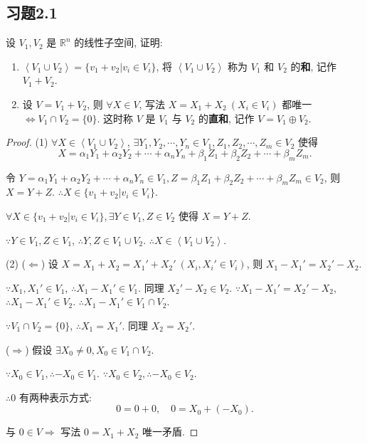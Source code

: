 \documentclass[color=black,device=normal,lang=cn,mode=geye]{elegantnote}
\begin{document}
\subsection{习题2.1}
\begin{exercise}[有改动]\label{ex1.1}
    设 $V_1,V_2$ 是 $\mathbb{R}^n$ 的线性子空间, 证明:
    \begin{enumerate}
        \def\labelenumi{(\arabic{enumi})}
        \item $\left<V_1\cup V_2\right>=\{v_1+v_2|v_i\in V_i\}$, 将 $\left<V_1\cup V_2\right>$ 称为 $V_1$ 和 $V_2$ 的\textbf{和}, 记作 $V_1+V_2$.
        \item 设 $V=V_1+V_2$, 则 $\forall X\in V$, 写法 $X=X_1+X_2\ (X_i\in V_i)$ 都唯一 $\Leftrightarrow V_1\cap V_2=\{0\}$. 这时称 $V$ 是 $V_1$ 与 $V_2$ 的\textbf{直和}, 记作 $V=V_1\oplus V_2$.
    \end{enumerate}
\end{exercise}
\begin{proof}
    (1) $\forall X\in\left<V_1\cup V_2\right>$, $\exists Y_1,Y_2,\cdots,Y_n\in V_1,Z_1,Z_2,\cdots,Z_m\in V_2$ 使得
    \[X=\alpha_1Y_1+\alpha_2Y_2+\cdots+\alpha_nY_n+\beta_1Z_1+\beta_2Z_2+\cdots+\beta_mZ_m.\]

    令 $Y=\alpha_1Y_1+\alpha_2Y_2+\cdots+\alpha_nY_n\in V_1,Z=\beta_1Z_1+\beta_2Z_2+\cdots+\beta_mZ_m\in V_2$, 则 $X=Y+Z$. $\therefore X\in\{v_1+v_2|v_i\in V_i\}$.

    $\forall X\in\{v_1+v_2|v_i\in V_i\},\exists Y\in V_1,Z\in V_2$ 使得 $X=Y+Z$.

    $\because Y\in V_1,Z\in V_1$, $\therefore Y,Z\in V_1\cup V_2$. $\therefore X\in\left<V_1\cup V_2\right>$.
    
    (2) ($\Leftarrow$) 设 $X=X_1+X_2=X_1'+X_2'\ (X_i,X_i'\in V_i)$, 则 $X_1-X_1'=X_2'-X_2$.

    $\because X_1,X_1'\in V_1$, $\therefore X_1-X_1'\in V_1$. 同理 $X_2'-X_2\in V_2$. $\because X_1-X_1'=X_2'-X_2$, $\therefore X_1-X_1'\in V_2$. $\therefore X_1-X_1'\in V_1\cap V_2$.

    $\because V_1\cap V_2=\{0\}$, $\therefore X_1=X_1'$. 同理 $X_2=X_2'$.

    ($\Rightarrow$) 假设 $\exists X_0\neq0,X_0\in V_1\cap V_2$.

    $\because X_0\in V_1,\therefore-X_0\in V_1$. $\because X_0\in V_2,\therefore-X_0\in V_2$.

    $\therefore0$ 有两种表示方式:
    \[0=0+0,\quad0=X_0+(-X_0).\]

    与 $0\in V\Rightarrow$ 写法 $0=X_1+X_2$ 唯一矛盾.
\end{proof}
\end{document}
